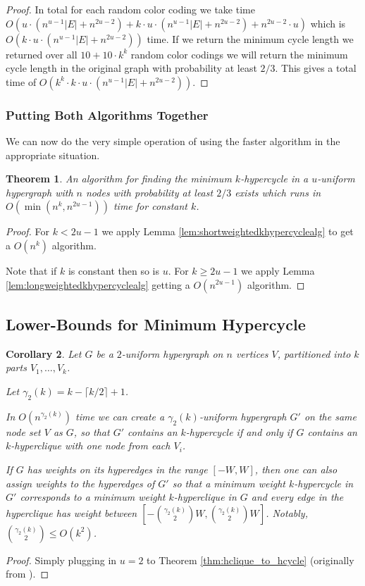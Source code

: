 \documentclass[11pt,letterpaper,pdftex]{article}
\newtheorem{theorem}{Theorem}[section]
\newtheorem{corollary}[theorem]{Corollary}
\begin{document}
\begin{proof}
    In total for each random color coding we take time $O(u \cdot  (n^{u-1}|E| + n^{2u-2}) + k \cdot u \cdot (n^{u-1}|E| + n^{2u-2}) + n^{2u-2}\cdot u)$ which is $O(k \cdot u \cdot (n^{u-1}|E| + n^{2u-2}))$ time. If we return the minimum cycle length we returned over all $10 + 10 \cdot k^k$ random color codings we will return the minimum cycle length in the original graph with probability at least $2/3$. This gives a total time of $O(k^k \cdot k \cdot u \cdot (n^{u-1}|E| + n^{2u-2}))$.
\end{proof}

\subsubsection{Putting Both Algorithms Together}
We can now do the very simple operation of using the faster algorithm in the appropriate situation. 

\begin{theorem}
    An algorithm for finding the minimum $k$-hypercycle in a $u$-uniform hypergraph with $n$ nodes with probability at least $2/3$ exists which runs in $O\left(\min(n^k, n^{2u-1})\right)$ time for constant $k$.
\end{theorem}
\begin{proof}
    For $k<2u-1$ we apply Lemma \ref{lem:shortweightedkhypercyclealg} to get a $O(n^k)$ algorithm. 

    Note that if $k$ is constant then so is $u$.
    For $k\geq 2u-1$ we apply Lemma \ref{lem:longweightedkhypercyclealg} getting a $O(n^{2u-1})$ algorithm. 
\end{proof}

\subsection{Lower-Bounds for Minimum Hypercycle}

\begin{corollary}
    Let $G$ be a $2$-uniform hypergraph on $n$ vertices $V$, partitioned into $k$ parts $V_1,\ldots,V_k$. 
    
    Let $\gamma_2(k)=k-\lceil k/2\rceil +1$.
    
    In $O(n^{\gamma_2(k)})$ time we can create a $\gamma_2(k)$-uniform hypergraph $G'$ on the same node set $V$ as $G$, so that $G'$ contains an $k$-hypercycle if and only if $G$ contains an $k$-hyperclique with one node from each $V_i$.
    
    If $G$ has weights on its hyperedges in the range $[-W,W]$, then one can also assign weights to the hyperedges of $G'$ so that a minimum weight $k$-hypercycle in $G'$ corresponds to a minimum weight $k$-hyperclique in $G$ and every edge in the hyperclique has weight between $[-\binom{\gamma_2(k)}{2}W,\binom{\gamma_2(k)}{2}W]$. Notably, $\binom{\gamma_2(k)}{2}\leq O(k^2)$.
\end{corollary}
\begin{proof}
Simply plugging in $u=2$ to Theorem \ref{thm:hclique_to_hcycle} (originally from \cite{LVW18}).
\end{proof}
\end{document}
